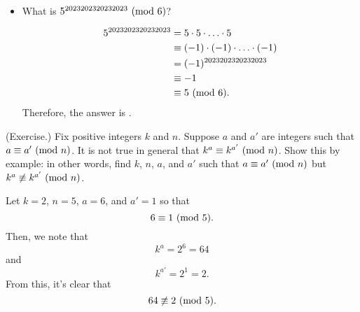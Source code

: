 \documentclass[letterpaper]{article}
\begin{document}
\begin{mdframed}
\begin{itemize}
\begin{mdframed}
\begin{equation*}
\begin{aligned}
                \end{aligned}
            \end{equation*}
        \end{mdframed}
        \item What is $5^{2023202320232023} \ (\mathrm{mod}\ 6)$?
        \begin{mdframed}
            \begin{equation*}
                \begin{aligned}
                    5^{2023202320232023} &= 5 \cdot 5 \cdot \hdots \cdot 5 \\ 
                        &\equiv (-1) \cdot (-1) \cdot \hdots \cdot (-1) \\ 
                        &= (-1)^{2023202320232023} \\ 
                        &\equiv -1 \\ 
                        &\equiv 5 \ (\mathrm{mod}\ 6).
                \end{aligned}
            \end{equation*}
            Therefore, the answer is .
        \end{mdframed}
    \end{itemize}
\end{mdframed}

\begin{mdframed}
    (Exercise.) Fix positive integers $k$ and $n$. Suppose $a$ and $a'$ are integers such that $a \equiv a' \ (\mathrm{mod}\ n)$. It is not true in general that $k^a \equiv k^{a'} \ (\mathrm{mod}\ n)$. Show this by example: in other words, find $k$, $n$, $a$, and $a'$ such that $a \equiv a' \ (\mathrm{mod}\ n)$ but $k^a \not\equiv k^{a'} \ (\mathrm{mod}\ n)$. 

    \begin{mdframed}
        Let $k = 2$, $n = 5$, $a = 6$, and $a' = 1$ so that 
        \[6 \equiv 1 \ (\mathrm{mod}\ 5).\]
        Then, we note that 
        \[k^a = 2^6 = 64\]
        and 
        \[k^{a'} = 2^1 = 2.\]
        From this, it's clear that 
        \[64 \not\equiv 2 \ (\mathrm{mod}\ 5).\]
    \end{mdframed}
\end{mdframed}
\end{document}
